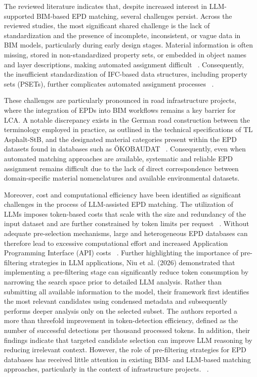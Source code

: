 \documentclass[10pt, a4paper, twocolumn]{article}
\begin{document}
The reviewed literature indicates that, despite increased interest in LLM-supported BIM-based EPD matching, several challenges persist. Across the reviewed studies, the most significant shared challenge is the lack of standardization and the presence of incomplete, inconsistent, or vague data in BIM models, particularly during early design stages. Material information is often missing, stored in non-standardized property sets, or embedded in object names and layer descriptions, making automated assignment difficult ~\cite{Forth.2023,Hermann.2024,J.HofmeyerK.ForthS.EsserA.Borrmann.,Petrosa.2025}. Consequently, the insufficient standardization of IFC-based data structures, including property sets (PSETs), further complicates automated assignment processes ~\cite{Wastiels.2019, PotrcObrecht.2020}.

These challenges are particularly pronounced in road infrastructure projects, where the integration of EPDs into BIM workflows remains a key barrier for LCA. A notable discrepancy exists in the German road construction between the terminology employed in practice, as outlined in the technical specifications of TL Asphalt-StB, and the designated material categories present within the EPD datasets found in databases such as ÖKOBAUDAT ~\cite{Kaus.2025}. Consequently, even when automated matching approaches are available, systematic and reliable EPD assignment remains difficult due to the lack of direct correspondence between domain-specific material nomenclatures and available environmental datasets. 

Moreover, cost and computational efficiency have been identified as significant challenges in the process of LLM-assisted EPD matching. The utilization of LLMs imposes token-based costs that scale with the size and redundancy of the input dataset and are further constrained by token limits per request ~\cite{Petrosa.2025}. Without adequate pre-selection mechanisms, large and heterogeneous EPD databases can therefore lead to excessive computational effort and increased Application Programming Interface (API) costs  ~\cite{Petrosa.2025}. Further highlighting the importance of pre-filtering strategies in LLM applications, Niu et al. (2026) demonstrated that implementing a pre-filtering stage can significantly reduce token consumption by narrowing the search space prior to detailed LLM analysis. Rather than submitting all available information to the model, their framework first identifies the most relevant candidates using condensed metadata and subsequently performs deeper analysis only on the selected subset. The authors reported a more than threefold improvement in token-detection efficiency, defined as the number of successful detections per thousand processed tokens. In addition, their findings indicate that targeted candidate selection can improve LLM reasoning by reducing irrelevant context. However, the role of pre-filtering strategies for EPD databases has received little attention in existing BIM- and LLM-based matching approaches, particularly in the context of infrastructure projects. ~\cite{ Niu et al (2026)}.  
\end{document}
